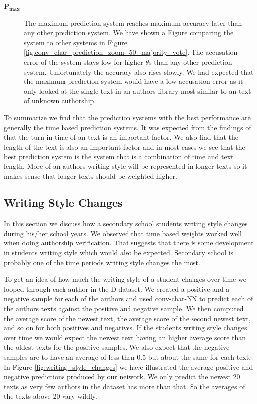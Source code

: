 \begin{description}
    \item[$\mathbf{P_{max}}$]

        The maximum prediction system reaches maximum accuracy
        later than any other prediction system. We have shown a
        Figure comparing the system to other systems in Figure
        \ref{fig:conv_char_prediction_zoom_50_majority_vote}. The accusation
        error of the system stays low for higher $\theta$s than any other
        prediction system. Unfortunately the accuracy also rises slowly. We had
        expected that the maximum prediction system would have a low accusation
        error as it only looked at the single text in an authors library most
        similar to an text of unknown authorship.

\end{description}

To summarize we find that the prediction systems with the best performance are
generally the time based prediction systems. It was expected from the findings
of \citet{hansen2014} that the turn in time of an text is an important factor.
We also find that the length of the text is also an important factor and in most
cases we see that the best prediction system is the system that is a combination
of time and text length. More of an authors writing style will be represented in
longer texts so it makes sense that longer texts should be weighted higher.


\subsection{Writing Style Changes}
\label{subsec:writing_style_changes}

In this section we discuss how a secondary school students writing style changes
during his/her school years. We observed that time based weights worked well
when doing authorship verification. That suggests that there is some development
in students writing style which would also be expected. Secondary school is
probably one of the time periods writing style changes the most.

To get an idea of how much the writing style of a student changes over time we
looped through each author in the \gls{D} dataset. We created a positive and a
negative sample for each of the authors and used \gls{conv-char-NN} to predict
each of the authors texts against the positive and negative sample. We then
computed the average score of the newest text, the average score of the second
newest text, and so on for both positives and negatives. If the students writing
style changes over time we would expect the newest text having an higher average
score than the oldest texts for the positive samples. We also expect that the
negative samples are to have an average of less then 0.5 but about the same
for each text. In Figure \ref{fig:writing_style_changes} we have illustrated
the average positive and negative predictions produced by our network. We only
predict the newest 20 texts as very few authors in the dataset has more than
that. So the averages of the texts above 20 vary wildly.

